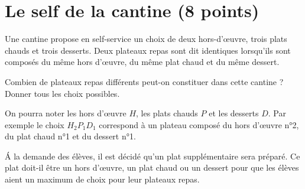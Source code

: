 \section{Le self de la cantine (8 points)}

Une cantine propose en self-service un choix de deux hors-d'\oe uvre, trois plats chauds et trois desserts. Deux plateaux repas sont dit identiques lorsqu'ils sont composés du même hors d'\oe uvre, du même plat chaud et du même dessert.

\begin{questions}
	\question[4] Combien de plateaux repas différents peut-on constituer dans cette cantine ? Donner tous les choix possibles. 
	
	
	On pourra noter les hors d'\oe uvre $H$, les plats chauds $P$ et les desserts $D$. Par exemple le choix $H_2P_1D_1$ correspond à un plateau composé du hors d'\oe uvre n°2, du plat chaud n°1 et du dessert n°1. 
	
	\question 
	
	\question[1] \'A la demande des élèves, il est décidé qu'un plat supplémentaire sera préparé. Ce plat doit-il être un hors d'\oe uvre, un plat chaud ou un dessert pour que les élèves aient un maximum de choix pour leur plateaux repas. 
\end{questions}